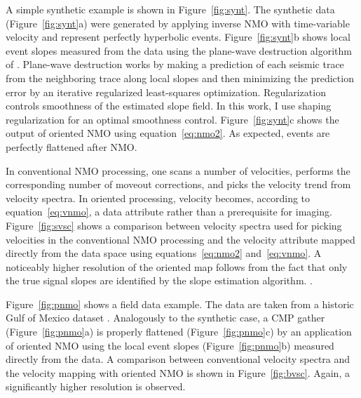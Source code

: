 A simple synthetic example is shown in Figure~\ref{fig:synt}. The
synthetic data (Figure~\ref{fig:synt}a) were generated by applying
inverse NMO with time-variable velocity and represent perfectly
hyperbolic events. Figure~\ref{fig:synt}b shows local event slopes
measured from the data using the plane-wave destruction algorithm of
\cite{GEO67-06-19461960}. Plane-wave destruction
\cite[]{Claerbout.blackwell.92} works by making a prediction of each
seismic trace from the neighboring trace along local slopes and then
minimizing the prediction error by an iterative regularized
least-squares optimization. Regularization controls smoothness of the
estimated slope field. In this work, I use shaping regularization
\cite[]{shape} for an optimal smoothness control.
Figure~\ref{fig:synt}c shows the output of oriented NMO using
equation~\ref{eq:nmo2}. As expected,   events are
perfectly flattened after NMO.


In conventional NMO processing, one scans a number of velocities,
performs the corresponding number of moveout corrections, and picks
the velocity trend from velocity spectra. In oriented processing,
velocity becomes, according to equation~\ref{eq:vnmo}, a data
attribute rather than a prerequisite for
imaging. Figure~\ref{fig:svsc} shows a comparison between velocity
spectra used for picking velocities in the conventional NMO processing
and the velocity attribute mapped directly from the data space using
equations~\ref{eq:nmo2} and~\ref{eq:vnmo}. A noticeably higher
resolution of the oriented map follows from the fact that only the
true signal slopes are identified by the slope estimation algorithm.
.



Figure~\ref{fig:pnmo} shows a field data example. The data are taken
from a historic Gulf of Mexico dataset \cite[]{bei}. Analogously to
the synthetic case, a CMP gather (Figure~\ref{fig:pnmo}a) is properly
flattened (Figure~\ref{fig:pnmo}c) by an application of oriented NMO
using the local event slopes (Figure~\ref{fig:pnmo}b) measured
directly from the data. A comparison between conventional velocity
spectra and the velocity mapping with oriented NMO is shown in
Figure~\ref{fig:bvsc}. Again, a significantly higher resolution is
observed.

